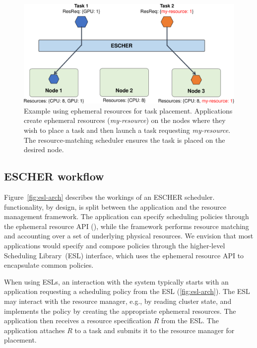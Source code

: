 \begin{figure}[t]
    \centering
    \includegraphics[width=0.82\linewidth]{escher/figures/logicalres_demo.pdf}
    \caption{Example using ephemeral resources for task placement. Applications create ephemeral resources (\emph{my-resource}) on the nodes where they wish to place a task and then launch a task requesting \emph{my-resource}. The resource-matching scheduler ensures the task is placed on the desired node.}
    \label{fig:er-example}
\end{figure}

\subsection{ESCHER workflow}
\label{sec:arch:design}

Figure~\ref{fig:esl-arch} describes the workings of an ESCHER scheduler. %
\name{} functionality, by design, is split between the application and the resource management framework.
The application can specify scheduling policies through the ephemeral resource API (), while the framework performs resource matching and accounting over a set of underlying physical resources.
We envision that most applications would specify and compose policies through the higher-level \name{} Scheduling Library~(ESL) interface, which uses the ephemeral resource API to encapsulate common policies.

When using ESLs, an interaction with the system typically starts with an application requesting a scheduling policy from the ESL (\cref{fig:esl-arch}).
The ESL may interact with the resource manager, e.g., by reading cluster state, and implements the policy by creating the appropriate ephemeral resources.
The application then receives a resource specification $R$ from the ESL.
The application attaches $R$ to a task and submits it to the resource manager for placement.

